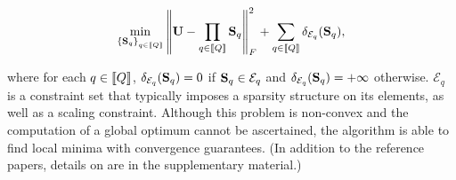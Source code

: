 \begin{align}
\label{eq:palm4msa}
\min_{\left \lbrace{\mathbf{S}}_q\right \rbrace_{q\in\left \llbracket Q\right \rrbracket}} \left \|{\mathbf{U}} -  \prod_{q\in\left \llbracket Q\right \rrbracket}{{\mathbf{S}}_q}\right \|_F^2 + \sum_{q\in\left \llbracket Q\right \rrbracket} \delta_{\mathcal{E}_q}({\mathbf{S}}_q),
\end{align}

where for each $q\in\left \llbracket Q\right \rrbracket$, $\delta_{\mathcal{E}_q}({\mathbf{S}}_q)=0$ 
if ${\mathbf{S}}_q \in \mathcal{E}_q$ and $\delta_{\mathcal{E}_q}({\mathbf{S}}_q)=+\infty$ otherwise. $\mathcal{E}_q$ is a constraint set that typically imposes a sparsity structure on its elements, as well as a scaling constraint. 
Although this problem is non-convex and the computation of a global optimum cannot be
ascertained, the \palm algorithm is able to find %
local minima with convergence guarantees. 
(In addition to the reference papers, details on \palm are in the supplementary material.)



